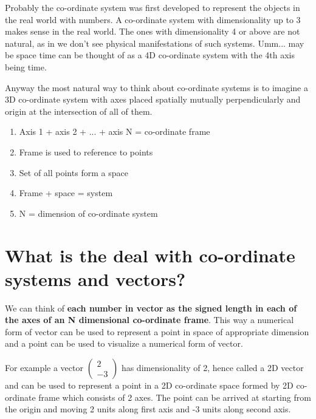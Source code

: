 \documentclass[12pt]{article}
\newcommand{\comment}[1]{}
\begin{document}
Probably the co-ordinate system was first developed to represent the objects in the real world with numbers. A co-ordinate system with dimensionality up to 3 makes sense in the real world. The ones with dimensionality 4 or above are not natural, as in we don't see physical manifestations of such systems. Umm... may be space time can be thought of as a 4D co-ordinate system with the 4th axis being time.

Anyway the most natural way to think about co-ordinate systems is to imagine a 3D co-ordinate system with axes placed spatially mutually perpendicularly and origin at the intersection of all of them.
\begin{enumerate}
  \item Axis 1 + axis 2 + ... + axis N = co-ordinate frame
  \item Frame is used to reference to points
  \item Set of all points form a space
  \item Frame + space = system
  \item N = dimension of co-ordinate system
\end{enumerate}

\section{What is the deal with co-ordinate systems and vectors?}
We can think of \textbf{each number in vector as the signed length in each of the axes of an N dimensional co-ordinate frame}.
This way a numerical form of vector can be used to represent a point in space of appropriate dimension and a point can be used to visualize a numerical form of vector.

\begin{figure}[h]
  \centering
\end{figure}


For example a vector $ \comment{Column-Vector: 2, -3} \begin{pmatrix} 2 \\  -3 \end{pmatrix} $  has dimensionality of 2, hence called a 2D vector and can be used to represent a point in a 2D co-ordinate space formed by 2D co-ordinate frame which consists of 2 axes. The point can be arrived at starting from the origin and moving 2 units along first axis and -3 units along second axis.
\end{document}
